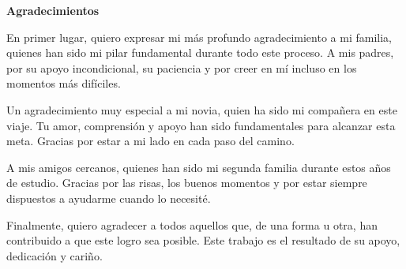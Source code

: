 {\Large \textbf{Agradecimientos} \vspace{.3cm}}

En primer lugar, quiero expresar mi más profundo agradecimiento a mi familia, quienes han sido mi pilar fundamental durante todo este proceso. A mis padres, por su apoyo incondicional, su paciencia y por creer en mí incluso en los momentos más difíciles.

Un agradecimiento muy especial a mi novia, quien ha sido mi compañera en este viaje. Tu amor, comprensión y apoyo han sido fundamentales para alcanzar esta meta. Gracias por estar a mi lado en cada paso del camino.

A mis amigos cercanos, quienes han sido mi segunda familia durante estos años de estudio. Gracias por las risas, los buenos momentos y por estar siempre dispuestos a ayudarme cuando lo necesité.

Finalmente, quiero agradecer a todos aquellos que, de una forma u otra, han contribuido a que este logro sea posible. Este trabajo es el resultado de su apoyo, dedicación y cariño.
